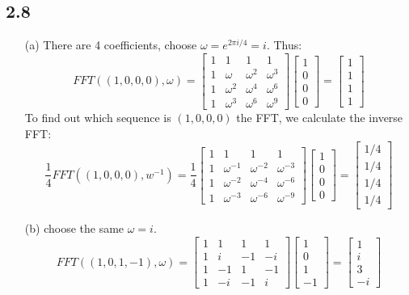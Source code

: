 \documentclass[twoside]{homework}
\begin{document}
\subsection*{2.8}
\begin{enumerate}
	\item [(a)] There are 4 coefficients, choose $\omega = e^{2\pi i/4} = i$. Thus:
		\[FFT((1, 0, 0, 0), \omega) = \begin{bmatrix}
			1 & 1 & 1 & 1 \\
			1 & \omega & \omega^2 & \omega^3 \\
			1 & \omega^2 &\omega^4 & \omega^6 \\
			1 & \omega^3 &\omega^6 & \omega^9
		\end{bmatrix} \begin{bmatrix}
			1 \\ 0\\ 0\\ 0
		\end{bmatrix}
		= \begin{bmatrix}
			1 \\ 1 \\ 1 \\ 1
		\end{bmatrix}
		\]
		To find out which sequence is $(1,0,0,0)$ the FFT, we calculate the inverse FFT:
		\[\frac{1}{4}FFT((1,0,0,0), w^{-1}) = \frac{1}{4}\begin{bmatrix}
			1 & 1 & 1 & 1 \\
			1 & \omega^{-1} & \omega^{-2} & \omega^{-3} \\
			1 & \omega^{-2} &\omega^{-4} & \omega^{-6} \\
			1 & \omega^{-3} &\omega^{-6} & \omega^{-9}
		\end{bmatrix} \begin{bmatrix}
			1 \\ 0\\ 0\\ 0
		\end{bmatrix}
		= \begin{bmatrix}
			1/4 \\ 1/4 \\ 1/4 \\ 1/4
		\end{bmatrix}\]
	\item [(b)] choose the same $\omega = i$.
	\[FFT((1, 0, 1, -1), \omega) = \begin{bmatrix}
		1 & 1 & 1 & 1 \\
		1 & i & -1 & -i \\
		1 & -1 & 1 & -1 \\
		1 & -i & -1 & i
	\end{bmatrix} \begin{bmatrix}
		1 \\ 0\\ 1\\ -1
	\end{bmatrix}
	= \begin{bmatrix}
		1 \\ i \\ 3 \\ -i
	\end{bmatrix}
	\]


\end{enumerate}
\end{document}
